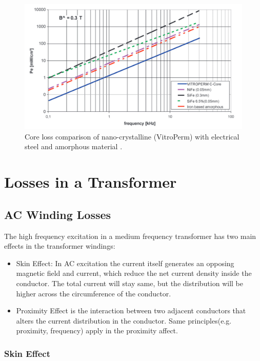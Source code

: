 \documentclass[a4paper, 11pt]{article} %
\begin{document}
\begin{figure}[]
  \centering
    \includegraphics[scale=0.3]{vitroperm_core_losses_vs_freq}
  \caption{Core loss comparison of nano-crystalline (VitroPerm) with electrical steel and amorphous material \cite{vitroterm_manual}.}
  \label{core-loss-log}
\end{figure}

\section{Losses in a Transformer}

\subsection{AC Winding Losses}

The high frequency excitation in a medium frequency transformer has two main effects in the transformer windings:
\begin{itemize}
  \item Skin Effect: In AC excitation the current itself generates an opposing magnetic field and current, which reduce the net current density inside the conductor. The total current will stay same, but the distribution will be higher across the circumference of the conductor.
  \item Proximity Effect is the interaction between two adjacent conductors that alters the current distribution in the conductor. Same principles(e.g. proximity, frequency) apply in the proximity affect.
\end{itemize}

\subsubsection{Skin Effect}
\end{document}
